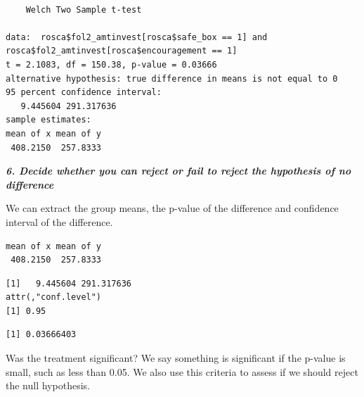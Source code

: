 \documentclass[
  letterpaper,
  DIV=11,
  numbers=noendperiod]{scrreprt}
\newenvironment{Shaded}{\begin{snugshade}}{\end{snugshade}}
\newcommand{\NormalTok}[1]{\textcolor[rgb]{0.00,0.23,0.31}{#1}}
\newcommand{\SpecialCharTok}[1]{\textcolor[rgb]{0.37,0.37,0.37}{#1}}
\begin{document}
\begin{verbatim}

    Welch Two Sample t-test

data:  rosca$fol2_amtinvest[rosca$safe_box == 1] and rosca$fol2_amtinvest[rosca$encouragement == 1]
t = 2.1083, df = 150.38, p-value = 0.03666
alternative hypothesis: true difference in means is not equal to 0
95 percent confidence interval:
   9.445604 291.317636
sample estimates:
mean of x mean of y 
 408.2150  257.8333 
\end{verbatim}

\textbf{\emph{6. Decide whether you can reject or fail to reject the
hypothesis of no difference}}

We can extract the group means, the p-value of the difference and
confidence interval of the difference.

\begin{Shaded}
\end{Shaded}

\begin{verbatim}
mean of x mean of y 
 408.2150  257.8333 
\end{verbatim}

\begin{Shaded}
\end{Shaded}

\begin{verbatim}
[1]   9.445604 291.317636
attr(,"conf.level")
[1] 0.95
\end{verbatim}

\begin{Shaded}
\end{Shaded}

\begin{verbatim}
[1] 0.03666403
\end{verbatim}

Was the treatment significant? We say something is significant if the
p-value is small, such as less than 0.05. We also use this criteria to
assess if we should reject the null hypothesis.
\end{document}

